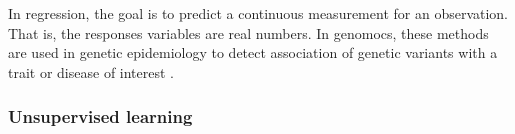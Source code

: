 In regression, the goal is to predict a continuous measurement for an observation. That is, the responses variables are real numbers. In genomocs, these methods are  used in genetic epidemiology to detect association of genetic variants with a trait or disease of interest \cite{dasgupta2011brief}.




\subsubsection{Unsupervised learning}





